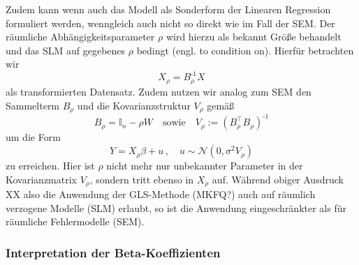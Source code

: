 Zudem kann wenn auch das Modell als Sonderform der Linearen Regression formuliert werden, wenngleich auch 
nicht so direkt wie im Fall der SEM. Der räumliche Abhängigkeitsparameter $\rho$ wird hierzu als bekannt Größe
behandelt und das SLM auf gegebenes $\rho$ bedingt (engl. to condition on). Hierfür betrachten wir
\begin{equation*}
    X_{\rho}=B_{\rho}^{\text{-1}} X
\end{equation*}
als transformierten Datensatz. Zudem nutzen wir analog zum SEM den Sammelterm $B_{\rho}$ und 
die Kovarianzstruktur $V_{\rho}$ gemäß
\begin{equation*}
    B_{\rho}=\mathds{I}_{n}-\rho W \quad \text{sowie} \quad V_{\rho} := (B_{\rho}^{\top} B_{\rho})^{\text{-1}}
\end{equation*}
um die Form
\begin{equation}
    Y=X_{\rho} \beta + u \, , \quad u \sim \mathcal{N}(0,\sigma^{2} V_{\rho})
\end{equation}
zu erreichen. Hier ist $\rho$ nicht mehr nur unbekannter Parameter in der Kovarianzmatrix $V_{\rho}$, 
sondern tritt ebenso in $X_{\rho}$ auf. Während obiger Ausdruck XX also die Anwendung der 
GLS-Methode (MKFQ?) auch auf räumlich verzogene Modelle (SLM) erlaubt, so ist die Anwendung eingeschränkter als 
für räumliche Fehlermodelle (SEM).

\subsubsection{Interpretation der Beta-Koeffizienten}


